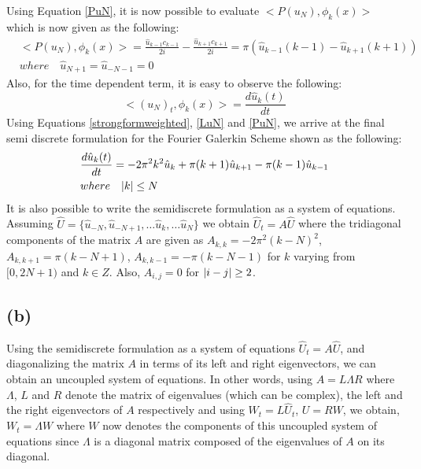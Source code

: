 \documentclass[12pt]{article}
\DeclarePairedDelimiter\abs{\lvert}{\rvert}
\begin{document}
Using Equation \ref{PuN}, it is now possible to evaluate $<P(u_N), \phi_k(x)>$ which is now given as the following:
\begin{equation}
\begin{aligned}
    & <P(u_N), \phi_k(x)> = \frac{\hat{u}_{k - 1} c_{k - 1}}{2i} - \frac{\hat{u}_{k + 1} c_{k + 1}}{2i} = \pi\left( \hat{u}_{k - 1}(k - 1) - \hat{u}_{k + 1}(k + 1)  \right) \\
    & where \quad \hat{u}_{N + 1} = \hat{u}_{-N - 1} = 0
\end{aligned}
\label{projection_of_PuN}
\end{equation}
Also, for the time dependent term, it is easy to observe the following:
\begin{equation}
    <(u_N)_t, \phi_k(x)> = \frac{d \hat{u}_k(t)}{dt}
    \label{timedep}
\end{equation}
Using Equations \ref{strongformweighted}, \ref{LuN} and \ref{PuN}, we arrive at the final semi discrete formulation for the Fourier Galerkin Scheme shown as the following:
\begin{equation}
\begin{aligned}
    & \frac{d \hat{u}_k(t)}{dt} = - 2 \pi^2 k^2 \hat{u}_k + \pi (k + 1) \hat{u}_{k + 1} - \pi (k - 1) \hat{u}_{k - 1} \\
    & where \quad \abs{k} \leq N
\end{aligned}
\label{semidiscrete}
\end{equation}
It is also possible to write the semidiscrete formulation as a system of equations. Assuming $\hat{U} = \{ \hat{u}_{-N}, \hat{u}_{-N + 1}, \ldots \hat{u}_k, \ldots \hat{u}_{N} \}$ we obtain $\hat{U}_t = A\hat{U}$ where the tridiagonal components of the matrix $A$ are given as $A_{k,k} = - 2 \pi^2 (k - N)^2$, $A_{k, k+ 1} = \pi (k - N + 1)$, $A_{k, k - 1} = -\pi (k - N - 1)$ for $k$ varying from $[0, 2N + 1)$ and $k \in Z$. Also, $A_{i, j} = 0$ for $\abs{i - j} \geq 2$.

\subsection{(b)}
Using the semidiscrete formulation as a system of equations $\hat{U}_t = A\hat{U}$, and diagonalizing the matrix $A$ in terms of its left and right eigenvectors, we can obtain an uncoupled system of equations. In other words, using $A = L \Lambda R$ where $\Lambda$, $L$ and $R$ denote the matrix of eigenvalues (which can be complex), the left and the right eigenvectors of $A$ respectively and using $W_t = L \hat{U}_t$, $U = R W$, we obtain, $W_t = \Lambda W$ where $W$ now denotes the components of this uncoupled system of equations since $\Lambda$ is a diagonal matrix composed of the eigenvalues of $A$ on its diagonal. 
\end{document}
